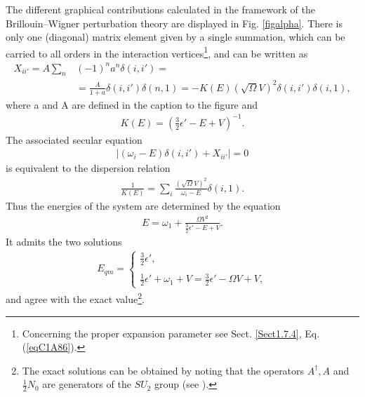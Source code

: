 The different graphical contributions calculated in the framework of the
Brillouin--Wigner perturbation theory are displayed in Fig. \ref{figalpha}. There is only
one (diagonal) matrix element given by a single summation, which can be
carried to all orders in the interaction vertices\footnote{Concerning the proper expansion parameter see Sect. \ref{Sect1.7.4}, Eq. (\ref{eqC1A86}).}, and can be written as
 \begin{align}\label{eqC1A31} 
\nonumber X_{ii'}=A\sum_n&(-1)^na^n\delta(i,i')=\\
&=\frac{A}{1+a}\delta(i,i')\delta(n,1)=-K(E)(\sqrt{\Omega}V)^2\delta(i,i')\delta(i,1),
 \end{align}
where a and A are defined in the caption to the figure and
 \begin{align}\label{eqC1A32} 
K(E)=\left(\tfrac{3}{2}\epsilon'-E+V\right)^{-1}.
 \end{align}
The associated secular equation
 \begin{align}\label{eqC1A33} 
\left|(\omega_i-E)\delta(i,i')+X_{ii'}\right|=0
 \end{align}
is equivalent to the dispersion relation
 \begin{align}\label{eqC1A34} 
\frac{1}{K(E)}=\sum_i\frac{\left(\sqrt{\Omega}V\right)^2}{\omega_i-E}\delta(i,1).
 \end{align}
Thus the energies of the system are determined by the equation
 \begin{align}\label{eqC1A35} 
E=\omega_1+\frac{\Omega V^2}{\tfrac{3}{2}\epsilon'-E+V}.
 \end{align}
It admits the two solutions
 \begin{align}\label{eqC1A36} 
E_{qm}=\left\{\begin{array}{l}
\frac{3}{2}\epsilon', \\ 
\\
\frac{1}{2}\epsilon'+\omega_1+V=\frac{3}{2}\epsilon'-\Omega V+V,
\end{array} 
\right.
 \end{align}
and agree with the exact value\footnote{The exact solutions can be  obtained  by noting that the operators $A^\dagger,A$ and $\frac{1}{2}N_0$ are generators of the $SU_2$ group (see \cite{Bortignon:77}).}.


